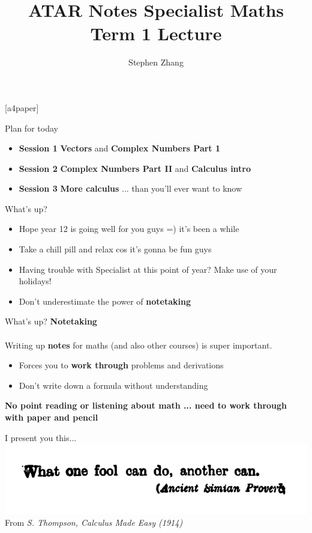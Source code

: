 \documentclass{beamer}
\title{ATAR Notes Specialist Maths Term 1 Lecture}
\author{Stephen Zhang}
\begin{document}
[a4paper]


\begin{frame}
	\titlepage
\end{frame}

\begin{frame}{Plan for today}
	\begin{itemize}
		\item \textbf{Session 1} \textbf{Vectors} and \textbf{Complex Numbers Part 1}
		\item \textbf{Session 2} \textbf{Complex Numbers Part II} and \textbf{Calculus intro}
		\item \textbf{Session 3} \textbf{More calculus} ... than you'll ever want to know
	\end{itemize}
\end{frame}

\begin{frame}{What's up?}
	\begin{itemize}
		\item Hope year 12 is going well for you guys =) it's been a while
		\item Take a chill pill and relax cos it's gonna be fun guys
		\item Having trouble with Specialist at this point of year? Make use of your holidays!
		\item Don't underestimate the power of \textbf{notetaking}
	\end{itemize}
\end{frame}

\begin{frame}{What's up?}
	\textbf{Notetaking}\\~\\
	Writing up \textbf{notes} for maths (and also other courses) is super important.
	\begin{itemize}
		\item Forces you to \textbf{work through} problems and derivations
		\item Don't write down a formula without understanding
	\end{itemize}
	\begin{center}
		\textbf{No point reading or listening about math ... need to work through with paper and pencil}
	\end{center}
\end{frame}

\begin{frame}{I present you this...}
	\includegraphics[width = \linewidth]{img/quote1.png}\\
	From \textit{S. Thompson, Calculus Made Easy (1914)}
 \end{frame}
\end{document}
